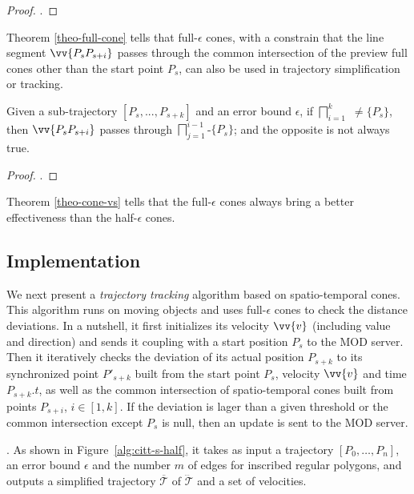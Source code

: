 \begin{proof}
	\todo.
\end{proof}

Theorem \ref{theo-full-cone} tells that full-$\epsilon$ cones, with a constrain that the line segment $\vv{P_sP_{s+i}}$ passes through the common intersection of the preview full cones other than the start point $P_s$, can also be used in trajectory simplification or tracking. 

\begin{theorem}
	\label{theo-cone-vs}
	Given a sub-trajectory $[P_s,...,P_{s+k}]$ and an error bound $\epsilon$, if $\bigsqcap_{i=1}^{k}$ $\ne \{P_s\}$, then $\vv{P_sP_{s+i}}$ passes through $\bigsqcap_{j=1}^{i-1}$-$\{P_s\}$; and the opposite is not always true.
\end{theorem}

\begin{proof}
	\todo.
\end{proof}

Theorem \ref{theo-cone-vs} tells that the full-$\epsilon$ cones always bring a better effectiveness than the half-$\epsilon$ cones.

\subsection{Implementation}

We next present a {\em trajectory tracking} algorithm based on spatio-temporal cones. This algorithm runs on moving objects and uses full-$\epsilon$ cones to check the distance deviations. In a nutshell, it first initializes its velocity $\vv{v}$ (including value and direction) and sends it coupling with a start position $P_s$ to the MOD server. Then it iteratively checks the deviation of its actual position $P_{s+k}$ to its synchronized point $P'_{s+k}$ built from the start point $P_s$, velocity $\vv{v}$ and time $P_{s+k}.t$, as well as the common intersection of spatio-temporal cones built from points $P_{s+i}$, $i \in [1, k]$. If the deviation is lager than a given threshold or the common intersection except $P_s$ is null, then an update is sent to the MOD server.


.
As shown in Figure~\ref{alg:citt-s-half}, it takes as input a trajectory ${[P_0, \ldots, P_n]}$, an error bound $\epsilon$ and the number $m$ of edges for inscribed regular polygons, and outputs a simplified  trajectory $\overline{\mathcal{T}}$ of $\dddot{\mathcal{T}}$ and a set of velocities.

